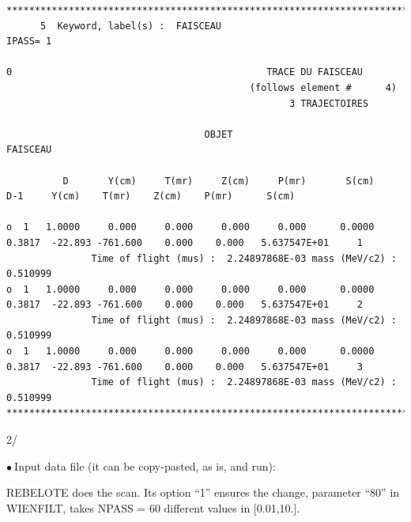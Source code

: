 \documentclass[10pt]{article}
\newcommand{\nib}{\noindent \ensuremath{\bullet~}}
\begin{document}
{\tiny
\begin{verbatim}
*******************************************************************************************************************************
      5  Keyword, label(s) :  FAISCEAU                                                                                 IPASS= 1

0                                             TRACE DU FAISCEAU
                                           (follows element #      4)
                                                  3 TRAJECTOIRES

                                   OBJET                                                  FAISCEAU

          D       Y(cm)     T(mr)     Z(cm)     P(mr)       S(cm)      D-1     Y(cm)    T(mr)    Z(cm)    P(mr)      S(cm)

o  1   1.0000     0.000     0.000     0.000     0.000      0.0000    0.3817  -22.893 -761.600    0.000    0.000   5.637547E+01     1
               Time of flight (mus) :  2.24897868E-03 mass (MeV/c2) :  0.510999    
o  1   1.0000     0.000     0.000     0.000     0.000      0.0000    0.3817  -22.893 -761.600    0.000    0.000   5.637547E+01     2
               Time of flight (mus) :  2.24897868E-03 mass (MeV/c2) :  0.510999    
o  1   1.0000     0.000     0.000     0.000     0.000      0.0000    0.3817  -22.893 -761.600    0.000    0.000   5.637547E+01     3
               Time of flight (mus) :  2.24897868E-03 mass (MeV/c2) :  0.510999    
*******************************************************************************************************************************
\end{verbatim}
}


\clearpage

2/


\nib   Input data file (it can be copy-pasted, as is, and run):

REBELOTE does the scan. Its option ``1'' ensures the change, parameter ``80''  in WIENFILT, takes NPASS = 60 different values
in [0.01,10.].
\end{document}
